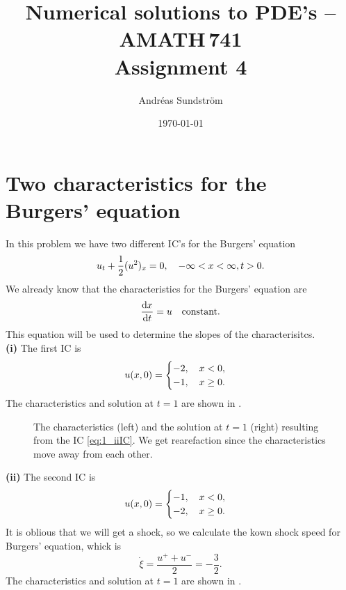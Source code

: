 \documentclass[11pt,letter, swedish, english
]{article}
\renewcommand{\thesubsection}{\arabic{section} (\alph{subsection})}
\begin{document}

\title{Numerical solutions to PDE's -- AMATH\,741 \\
Assignment 4}
\author{Andréas Sundström}
\date{\today}

\maketitle


\section{Two characteristics for the Burgers' equation}
In this problem we have two different IC's for the Burgers' equation
\begin{equation}
u_t + \frac{1}{2} (u^2)_x = 0\qcomma
-\infty<x<\infty, t>0.
\end{equation}
We already know that the characteristics for the Burgers' equation are
\begin{equation}
\dv{x}{t} = u \quad\text{constant.}
\end{equation}
This equation will be used to determine the slopes of the
characterisitcs. 
\\[11pt]
\noindent
\textbf{(i) }
The first IC is
\begin{equation}\label{eq:1_iIC}
u(x, 0) = 
\begin{cases}
-2\qcomma x<0,\\
-1\qcomma x\ge0.
\end{cases}
\end{equation}
The characteristics and solution at $t=1$ are shown in .

\begin{figure}
\centering
\resizebox{!}{3.6cm}{}
\caption{The characteristics (left) and the solution at $t=1$ (right) 
  resulting from the IC \eqref{eq:1_iiIC}. We get rearefaction since
  the characteristics move away from each other.} 
\label{fig:1i}
\end{figure}

\noindent
\textbf{(ii) }
The second IC is
\begin{equation}\label{eq:1_iiIC}
u(x, 0) = 
\begin{cases}
-1\qcomma x<0,\\
-2\qcomma x\ge0.
\end{cases}
\end{equation}
It is oblious that we will get a shock, so we calculate the kown shock
speed for Burgers' equation, whick is
\begin{equation}
\dot\xi = \frac{u^++u^-}{2} = -\frac{3}{2}.
\end{equation}
The characteristics and solution at $t=1$ are shown in .
\end{document}
